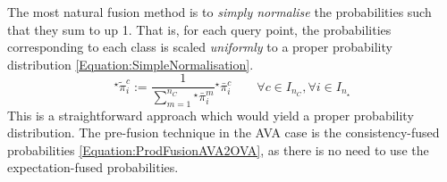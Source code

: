 					
					The most natural fusion method is to \textit{simply normalise} the probabilities such that they sum to up 1. That is, for each query point, the probabilities corresponding to each class is scaled \textit{uniformly} to a proper probability distribution \eqref{Equation:SimpleNormalisation}. \begin{equation}
						{^{\star}}\tilde{\pi}^{c}_{i} := \frac{1}{\sum_{m = 1}^{n_{C}} {^{\star}}\bar{\pi}^{m}_{i}} {^{\star}}\bar{\pi}^{c}_{i} \qquad \forall c \in I_{n_{C}}, \forall i \in I_{n_{\star}}
					\label{Equation:SimpleNormalisation}
					\end{equation} This is a straightforward approach which would yield a proper probability distribution. The pre-fusion technique in the AVA case is the consistency-fused probabilities \eqref{Equation:ProdFusionAVA2OVA}, as there is no need to use the expectation-fused probabilities.
					
					
